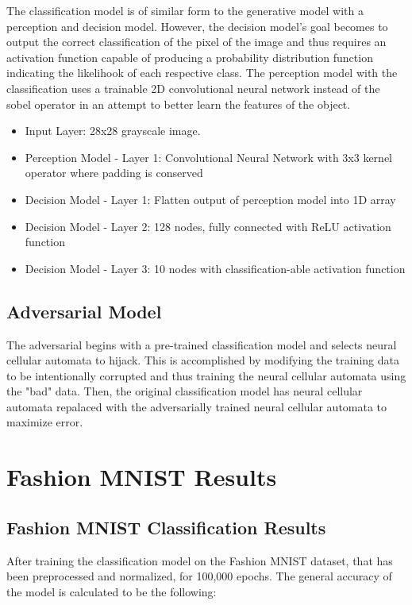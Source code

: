 \documentclass[conference]{IEEEtran}
\begin{document}
The classification model is of similar form to the generative model with a perception and decision model. However, the decision model's goal becomes to output the correct classification of the pixel of the image and thus requires an activation function capable of producing a probability distribution function indicating the likelihook of each respective class. The perception model with the classification uses a trainable 2D convolutional neural network instead of the sobel operator in an attempt to better learn the features of the object.

\begin{itemize}
    \item Input Layer: 28x28 grayscale image.
    \item Perception Model - Layer 1: Convolutional Neural Network with 3x3 kernel operator where padding is conserved
    \item Decision Model - Layer 1: Flatten output of perception model into 1D array
    \item Decision Model - Layer 2: 128 nodes, fully connected with ReLU activation function
    \item Decision Model - Layer 3: 10 nodes with classification-able activation function 
\end{itemize}

\subsection{Adversarial Model} 

The adversarial begins with a pre-trained classification model and selects neural cellular automata to hijack. This is accomplished by modifying the training data to be intentionally corrupted and thus training the neural cellular automata using the "bad" data. Then, the original classification model has neural cellular automata repalaced with the adversarially trained neural cellular automata to maximize error. 

\section{Fashion MNIST Results}

\subsection{Fashion MNIST Classification Results}

After training the classification model on the Fashion MNIST dataset, that has been preprocessed and normalized, for 100,000 epochs. The general accuracy of the model is calculated to be the following:
\end{document}
